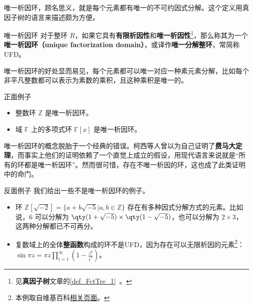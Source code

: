 


唯一析因环，顾名思义，就是每个元素都有唯一的不可约因式分解。这个定义用真因子树的语言来描述颇为方便。

\begin{definition}{唯一析因环}
对于整环 $R$，如果它具有\textbf{有限析因性}和\textbf{唯一析因性}\footnote{见\textbf{真因子树}文章的\autoref{def_FctTre_1}~。}，那么称其为一个\textbf{唯一析因环（unique factorization domain）}，或译作\textbf{唯一分解整环}，常简称UFD。
\end{definition}


唯一析因环的好处显而易见，每个元素都可以唯一对应一种素元素分解，比如每个非平凡整数都可以表示为素数的乘积，且这种乘积是唯一的。

\begin{example}{正面例子}
\begin{itemize}
\item 整数环 $\mathbb{Z}$ 是唯一析因环。
\item 域 $\mathbb{F}$ 上的多项式环 $\mathbb{F}[x]$ 是唯一析因环。
\end{itemize}
\end{example}

唯一析因环的概念脱胎于一个经典的错误。柯西等人曾以为自己证明了\textbf{费马大定理}，而事实上他们的证明依赖了一个直觉上成立的假设，用现代语言来说就是“所有的环都是唯一析因环”。然而很可惜，存在不唯一析因的环，这也成了此类证明中的命门。

\begin{example}{反面例子}
我们给出一些不是唯一析因环的例子。
\begin{itemize}
\item 环 $\mathbb{Z}[\sqrt{-2}]=\{a+b\sqrt{-5}|a, b\in\mathbb{Z}\}$ 存在有多种因式分解方式的元素。比如说，$6$ 可以分解为 $\qty(1+\sqrt{-5})\times \qty(1-\sqrt{-5})$，也可以分解为 $2\times 3$，这两种分解都已不可再分。
\item 复数域上的全体\textbf{整函数}构成的环不是UFD，因为存在可以无限析因的元素\footnote{本例取自维基百科\href{https://en.wikipedia.org/wiki/Unique_factorization_domain}{相关页面}。}：$\sin{\pi z=\pi z\prod\limits_{i=1}^\infty(1-\frac{z^2}{i^2})}$。
\end{itemize}
\end{example}



